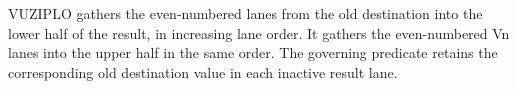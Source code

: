 VUZIPLO gathers the even-numbered lanes from the old destination into the lower
half of the result, in increasing lane order.  It gathers the even-numbered Vn
lanes into the upper half in the same order.  The governing predicate retains
the corresponding old destination value in each inactive result lane.
